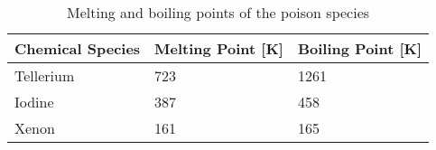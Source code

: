 \begin{table}[h]
\begin{tabularx}{\linewidth}{ |X|X|X| }
  \hline
 \textbf{Chemical Species} & \textbf{Melting Point [K]} & \textbf{Boiling Point [K]} \\
  \hline 
  Tellerium  & 723  & 1261   \\
  \hline
  Iodine & 387 & 458 \\
   \hline
   Xenon & 161  &  165 \\
   \hline
\end{tabularx}
\caption{Melting and boiling points of the poison species \cite[p. 4-118]{CRCChemPhy97}}
\label{boilMeltTbl}
\end{table}